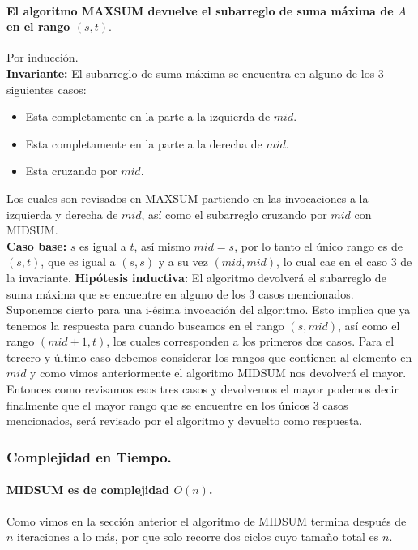 \documentclass[12pt]{article}
\begin{document}
\paragraph{El algoritmo MAXSUM devuelve el subarreglo de suma máxima de $A$ en el rango $(s, t).$} 
Por inducción.\\
\textbf{Invariante:} El subarreglo de suma máxima se encuentra en alguno de los 3 siguientes casos:
\begin{itemize}
	\item Esta completamente en la parte a la izquierda de $mid$.
	\item Esta completamente en la parte a la derecha de $mid$.
	\item Esta cruzando por $mid$.
\end{itemize}
Los cuales son revisados en MAXSUM partiendo en las invocaciones a la izquierda y derecha de $mid$, así como el subarreglo cruzando por $mid$ con MIDSUM.\\
\textbf{Caso base:} $s$ es igual a $t$, así mismo $mid=s$, por lo tanto el único rango es de $(s,t)$, que es igual a $(s, s)$ y a su vez $(mid, mid)$, lo cual cae en el caso 3 de la invariante.
\textbf{Hipótesis inductiva:} El algoritmo devolverá el subarreglo de suma máxima que se encuentre en alguno de los 3 casos mencionados.\\
Suponemos cierto para una i-ésima invocación del algoritmo. Esto implica que ya tenemos la respuesta para cuando buscamos en el rango $(s, mid)$, así como el rango $(mid + 1, t)$, los cuales corresponden a los primeros dos casos. Para el tercero y último caso debemos considerar los rangos que contienen al elemento en $mid$ y como vimos anteriormente el algoritmo MIDSUM nos devolverá el mayor. Entonces como revisamos esos tres casos y devolvemos el mayor podemos decir finalmente que el mayor rango que se encuentre en los únicos 3 casos mencionados, será revisado por el algoritmo y devuelto como respuesta.
\subsubsection{Complejidad en Tiempo.}
\paragraph{MIDSUM es de complejidad $O(n)$.} Como vimos en la sección anterior el algoritmo de MIDSUM termina después de $n$ iteraciones a lo más, por que solo recorre dos ciclos cuyo tamaño total es $n$.
\end{document}
